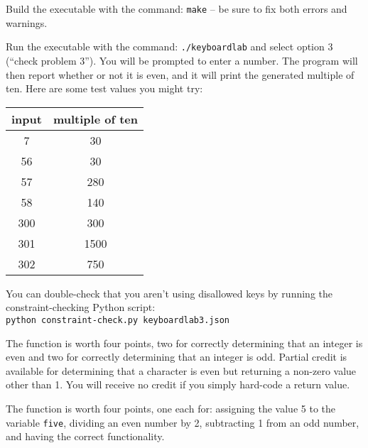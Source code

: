 Build the executable with the command: \texttt{make} -- be sure to fix both errors and warnings.

Run the executable with the command: \texttt{./keyboardlab} and select option 3 (``check problem 3'').
You will be prompted to enter a number.
The program will then report whether or not it is even, and it will print the generated multiple of ten.
Here are some test values you might try:

\begin{center}
    \begin{tabular}{cc}
        input   & multiple of ten \\ \hline
        7       & 30    \\
        56      & 30    \\
        57      & 280   \\
        58      & 140   \\
        300     & 300   \\
        301     & 1500  \\
        302     & 750   \\
    \end{tabular}
\end{center}

You can double-check that you aren't using disallowed keys by running the constraint-checking Python script: \\
\texttt{python constraint-check.py keyboardlab3.json}

The  function is worth four points, two for correctly determining that an integer is even and  two for correctly determining that an integer is odd.
Partial credit is available for determining that a character is even but returning a non-zero value other than 1.
You will receive no credit if you simply hard-code a return value.

The  function is worth four points, one each for: assigning the value 5 to the variable \lstinline{five}, dividing an even number by 2, subtracting 1 from an odd number, and having the correct functionality.
